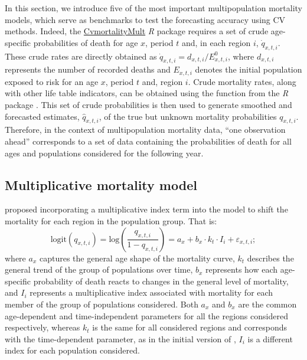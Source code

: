 In this section, we introduce five of the most important multipopulation mortality models, which serve as benchmarks to test the forecasting accuracy using CV methods. Indeed, the \href{https://cran.r-project.org/web/packages/CvmortalityMult/index.html}{CvmortalityMult} \emph{R} package requires a set of crude age-specific probabilities of death for age $x$, period $t$ and, in each region $i$, $\dot{q}_{x,t,i}$. These crude rates are directly obtained as $\dot{q}_{x,t,i}=d_{x,t,i}/E^{0}_{x,t,i}$, where $d_{x,t,i}$ represents the number of recorded deaths and $E_{x,t,i}$ denotes the initial population exposed to risk for an age $x$, period $t$ and, region $i$. Crude mortality rates, along with other life table indicators, can be obtained using the  function from the  \emph{R} package \citep{Pascariu2022}. This set of crude probabilities is then used to generate smoothed and forecasted estimates, $\hat{q}_{x,t,i}$, of the true but unknown mortality probabilities $q_{x,t,i}$. Therefore, in the context of multipopulation mortality data, ``one observation ahead'' corresponds to a set of data containing the probabilities of death for all ages and populations considered for the following year.

\subsection{Multiplicative mortality model}

\citet{Russolillo2011} proposed incorporating a multiplicative index term into the \citet{Lee1992} model to shift the mortality for each region in the population group. That is:
\begin{equation}
\textrm{logit}\left(q_{x,t,i} \right)=\textrm{log}\left(\frac{q_{x,t,i}}{1-q_{x,t,i}}\right)=a_x + b_x \cdot k_t \cdot I_i + \varepsilon_{x,t,i};
\label{EQ_ruso}
\end{equation}
where $a_x$ captures the general age shape of the mortality curve, $k_t$ describes the general trend of the group of populations over time, $b_x$ represents how each age-specific probability of death reacts to changes in the general level of mortality, and $I_i$ represents a multiplicative index associated with mortality for each member of the group of populations considered. Both $a_x$ and $b_x$ are the common age-dependent and time-independent parameters for all the regions considered respectively,  whereas $k_t$ is the same for all considered regions and corresponds with the time-dependent parameter, as in the initial version of \citet{Lee1992}, $I_i$ is a different index for each population considered.

